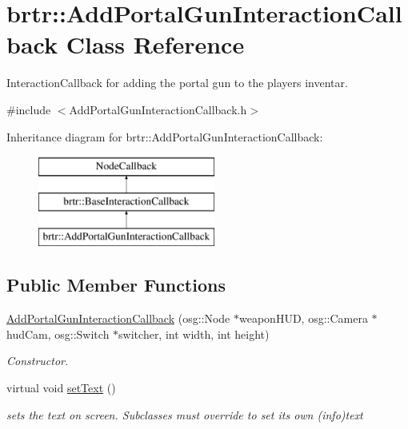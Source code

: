 \hypertarget{classbrtr_1_1_add_portal_gun_interaction_callback}{\section{brtr\+:\+:Add\+Portal\+Gun\+Interaction\+Callback Class Reference}
\label{classbrtr_1_1_add_portal_gun_interaction_callback}
}


Interaction\+Callback for adding the portal gun to the players inventar.  




{\ttfamily \#include $<$Add\+Portal\+Gun\+Interaction\+Callback.\+h$>$}

Inheritance diagram for brtr\+:\+:Add\+Portal\+Gun\+Interaction\+Callback\+:\begin{figure}[H]
\begin{center}
\leavevmode
\includegraphics[height=3.000000cm]{classbrtr_1_1_add_portal_gun_interaction_callback}
\end{center}
\end{figure}
\subsection*{Public Member Functions}
\begin{DoxyCompactItemize}
\item 
\hyperlink{classbrtr_1_1_add_portal_gun_interaction_callback_a849f25b53c2a3c81e8201777bf481c96}{Add\+Portal\+Gun\+Interaction\+Callback} (osg\+::\+Node $\ast$weapon\+H\+U\+D, osg\+::\+Camera $\ast$hud\+Cam, osg\+::\+Switch $\ast$switcher, int width, int height)
\begin{DoxyCompactList}\small\item\em Constructor. \end{DoxyCompactList}\item 
virtual void \hyperlink{classbrtr_1_1_add_portal_gun_interaction_callback_aa0db50622c7ae1cd25f8554c916137db}{set\+Text} ()
\begin{DoxyCompactList}\small\item\em sets the text on screen. Subclasses must override to set its own (info)text \end{DoxyCompactList}\end{DoxyCompactItemize}
